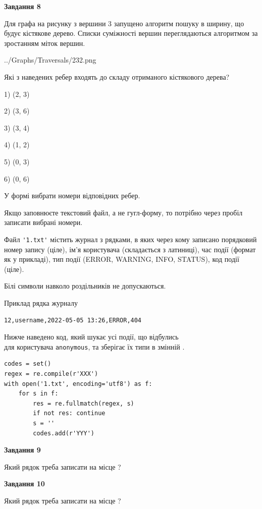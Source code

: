 \documentclass[12pt, ukrainian]{article}
\def\code#1{\Verb!#1!}
\begin{document}
{\begin {large}
{\begin {center}\textbf{Завдання 8}\end {center}}\par
Для графа на рисунку з вершини 3 запущено алгоритм пошуку в ширину, що будує кістякове дерево. Списки суміжності вершин переглядаються алгоритмом за зростанням міток вершин.\par
\begin{center}
	{../Graphs/Traversals/232.png}
\end{center}
\par Які з наведених ребер входять до складу отриманого кістякового дерева?\par
1) (2, 3)\par
2) (3, 6)\par
3) (3, 4)\par
4) (1, 2)\par
5) (0, 3)\par
6) (0, 6)\par
{\vskip 15pt} У формі вибрати номери відповідних ребер.


Якщо заповнюєте текстовий файл, а не гугл-форму, то потрібно через пробіл записа\-ти вибрані номери.\par
\newpage


Файл \code{'1.txt'} містить журнал з рядками, в яких через кому записано поряд\-ко\-вий номер запису (ціле), ім'я користувача (складається з латиниці), час події (фор\-мат як у прикладі), тип події (ERROR, WARNING, INFO, STATUS), код події (ціле).

Білі символи навколо роздільників не допускаються.

Приклад рядка журналу



\begin{verbatim}
12,username,2022-05-05 13:26,ERROR,404
\end{verbatim}


Нижче наведено код, який шукає усі події, що відбулись\\ для користувача \code{anonymous}, та зберігає їх типи в змінній .



\begin{verbatim}
codes = set()
regex = re.compile(r'XXX')
with open('1.txt', encoding='utf8') as f:
    for s in f:
        res = re.fullmatch(regex, s)
        if not res: continue
        s = ''
        codes.add(r'YYY')
\end{verbatim}


{\begin {center}\textbf{Завдання 9}\end {center}}\par
Який рядок треба записати на місце  ?\par
\vspace{5mm}


{\begin {center}\textbf{Завдання 10}\end {center}}\par
Який рядок треба записати на місце  ?\par


\newpage


\end {large}}
\end{document}
